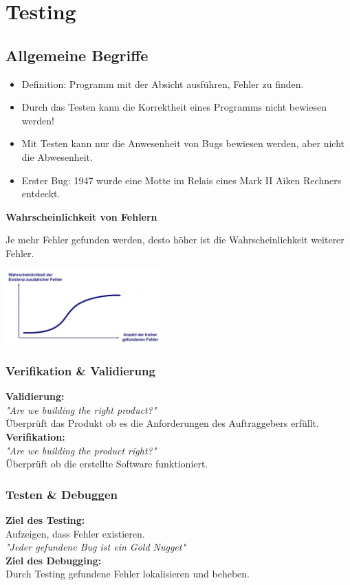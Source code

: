 \section{Testing}
\subsection{Allgemeine Begriffe}
\begin{itemize}
	\item Definition: Programm mit der Absicht ausführen, Fehler zu finden. 
	\item Durch das Testen kann die Korrektheit eines Programms nicht bewiesen werden!
	\item Mit Testen kann nur die Anwesenheit von Bugs bewiesen werden, aber nicht die Abwesenheit. 
	\item Erster Bug: 1947 wurde eine Motte im Relais eines Mark II Aiken Rechners entdeckt.
\end{itemize}

\textbf{Wahrscheinlichkeit von Fehlern}\\
\begin{minipage}{12cm}
Je mehr Fehler gefunden werden, desto höher ist die Wahrscheinlichkeit weiterer Fehler.
\end{minipage}
\begin{minipage}{6cm}
	\includegraphics[width=6cm]{images/fehler_wkeit.png}	
\end{minipage}

\begin{multicols}{2}
	\subsubsection{Verifikation \& Validierung}
	\textbf{Validierung:}\\
	\textit{"{}Are we building the right product?"}\\
	Überprüft das Produkt ob es die Anforderungen des Auftraggebers erfüllt.\\
	\textbf{Verifikation:}\\
	\textit{"{}Are we building the product right?"}\\
	Überprüft ob die erstellte Software funktioniert.\\
	
	\subsubsection{Testen \& Debuggen}
	\textbf{Ziel des Testing:} \\
	Aufzeigen, dass Fehler existieren.\\
	\textit{"{}Jeder gefundene Bug ist ein Gold Nugget"}\\
	\textbf{Ziel des Debugging:} \\
	Durch Testing gefundene Fehler lokalisieren und beheben.
	
\end{multicols}


